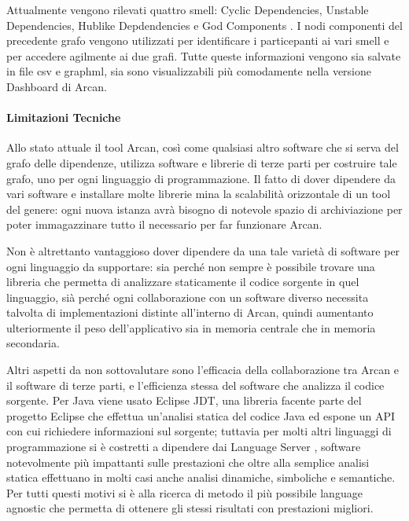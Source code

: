 
Attualmente vengono rilevati quattro smell: Cyclic Dependencies, Unstable Dependencies, Hublike Depdendencies e God Components \cite{cuesta2018software}. I nodi componenti del precedente grafo vengono utilizzati per identificare i particepanti ai vari smell e per accedere agilmente ai due grafi. Tutte queste informazioni vengono sia salvate in file csv e graphml, sia sono visualizzabili pi\`u comodamente nella versione Dashboard di Arcan.


\paragraph{Limitazioni Tecniche}

Allo stato attuale il tool Arcan, cos\`i come qualsiasi altro software che si serva del grafo delle dipendenze, utilizza software e librerie di terze parti per costruire tale grafo, uno per ogni linguaggio di programmazione. Il fatto di dover dipendere da vari software e installare molte librerie mina la scalabilit\`a orizzontale di un tool del genere: ogni nuova istanza avr\`a bisogno di notevole spazio di archiviazione per poter immagazzinare tutto il necessario per far funzionare Arcan.

Non \`e altrettanto vantaggioso dover dipendere da una tale variet\`a di software per ogni linguaggio da supportare: sia perch\'e non sempre \`e possibile trovare una libreria che permetta di analizzare staticamente il codice sorgente in quel linguaggio, si\`a perch\'e ogni collaborazione con un software diverso necessita talvolta di implementazioni distinte all'interno di Arcan, quindi aumentanto ulteriormente il peso dell'applicativo sia in memoria centrale che in memoria secondaria.

Altri aspetti da non sottovalutare sono l'efficacia della collaborazione tra Arcan e il software di terze parti, e l'efficienza stessa del software che analizza il codice sorgente. Per Java viene usato Eclipse JDT, una libreria facente parte del progetto Eclipse che effettua un'analisi statica del codice Java ed espone un API con cui richiedere informazioni sul sorgente; tuttavia per molti altri linguaggi di programmazione si \`e costretti a dipendere dai Language Server \cite{LanguageServer}, software notevolmente pi\`u impattanti sulle prestazioni che oltre alla semplice analisi statica effettuano in molti casi anche analisi dinamiche, simboliche e semantiche. Per tutti questi motivi si \`e alla ricerca di metodo il pi\`u possibile language agnostic che permetta di ottenere gli stessi risultati con prestazioni migliori.

